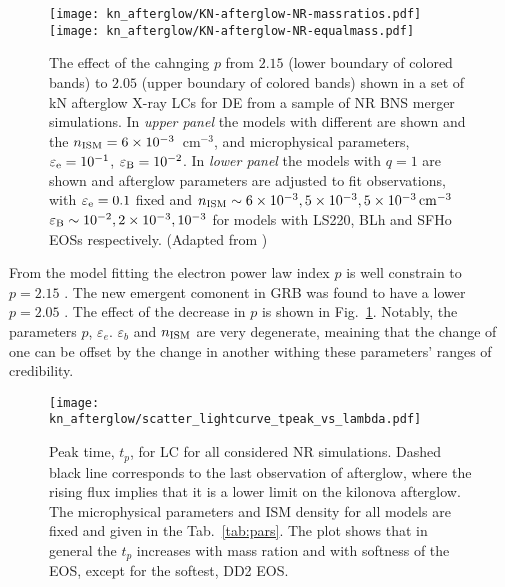 \begin{figure}
    \begin{center}
        \texttt{[image: kn\_afterglow/KN-afterglow-NR-massratios.pdf]}
        \texttt{[image: kn\_afterglow/KN-afterglow-NR-equalmass.pdf]}
        \caption{
            The effect of the cahnging $p$ from $2.15$ (lower boundary of colored bands) to 
            $2.05$ (upper boundary of colored bands) shown in a set of \ac{kN} afterglow 
            X-ray \acp{LC} for \ac{DE} from a sample of \ac{NR} \ac{BNS} merger simulations.
            In \emph{upper panel} the models with different \mr{} are shown and the 
            $n_{\text{ISM}}=6\times10^{-3}$~cm$^{-3}$, and microphysical parameters, 
            $\varepsilon_{\rm e}=10^{-1}$, $\varepsilon_{\rm B}=10^{-2}$.
            In \emph{lower panel} the models with $q=1$ are shown and afterglow
            parameters are adjusted to fit observations, 
            with $\varepsilon_{\rm e}=0.1$ fixed and  
            $n_{\text{ISM}}\sim 6\times 10^{-3}, 5\times 10^{-3},5\times 10^{-3}\,\rm{cm^{-3}}$
            $\varepsilon_{\rm B}\sim 10^{-2},2\times 10^{-3},10^{-3}$ for models with 
            LS220, BLh and SFHo \acp{EOS} respectively.
            (Adapted from \citet{Hajela:2021faz})
        }
    \end{center}
    \label{fig:kn_afterglow}
\end{figure}

From the \GRB{} model fitting the electron power law index $p$ is well constrain to $p=2.15$
\citep[\eg][]{Hajela:2019mjy}. The new emergent comonent in \ac{GRB} was found to have a lower 
$p=2.05$ \citep{Hajela:2021faz}. The effect of the decrease in $p$ is shown in 
Fig.~\ref{fig:kn_afterglow}. Notably, the parameters $p$, $\varepsilon_e$. $\varepsilon_b$ and 
$n_{\text{ISM}}$ are very degenerate, meaining that the change of one can be offset by the change in 
another withing these parameters' ranges of credibility. 

\begin{figure}%
    \centering 
    \texttt{[image: kn\_afterglow/scatter\_lightcurve\_tpeak\_vs\_lambda.pdf]}
    \caption{
        Peak time, $t_p$, for \ac{LC} for all considered \ac{NR} simulations. 
        Dashed black line corresponds to the last observation of \GRB{} afterglow,
        where the rising flux implies that it is a lower limit on the kilonova 
        afterglow.
        The microphysical parameters and \ac{ISM} density for all models are fixed and 
        given in the Tab.~\ref{tab:pars}.
        The plot shows that in general the $t_p$ increases with mass ration and with 
        softness of the \ac{EOS}, except for the softest, DD2 \ac{EOS}. 
    } 
    \label{fig:lightcurve_peaks}
\end{figure}

